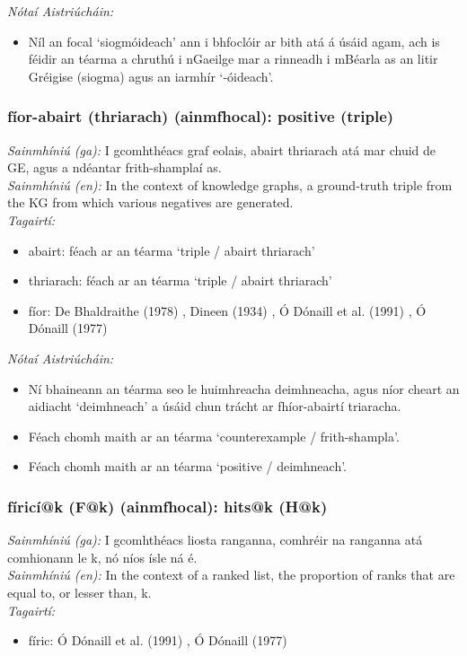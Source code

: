  \noindent \textit{Nótaí Aistriúcháin:}
\begin{itemize}
	\item Níl an focal `siogmóideach' ann i bhfoclóir ar bith atá á úsáid agam, ach is féidir an téarma a chruthú i nGaeilge mar a rinneadh i mBéarla as an litir Gréigise (siogma) agus an iarmhír `-óideach'.
\end{itemize}


\subsubsection*{fíor-abairt (thriarach) (ainmfhocal): positive (triple)}
 \noindent \textit{Sainmhíniú (ga):} I gcomhthéacs graf eolais, abairt thriarach atá mar chuid de GE, agus a ndéantar frith-shamplaí as.
\\
 \noindent \textit{Sainmhíniú (en):} In the context of knowledge graphs, a ground-truth triple from the KG from which various negatives are generated.
\\
 \noindent \textit{Tagairtí:}
\begin{itemize}
	\item abairt: féach ar an téarma `triple / abairt thriarach'
	\item thriarach: féach ar an téarma `triple / abairt thriarach'
	\item fíor: De Bhaldraithe (1978) \cite{de-bhaldraithe}, Dineen (1934) \cite{dineen}, Ó Dónaill et al. (1991) \cite{focloir-beag}, Ó Dónaill (1977) \cite{odonaill}
\end{itemize}

 \noindent \textit{Nótaí Aistriúcháin:}
\begin{itemize}
	\item Ní bhaineann an téarma seo le huimhreacha deimhneacha, agus níor cheart an aidiacht `deimhneach' a úsáid chun trácht ar fhíor-abairtí triaracha.
	\item Féach chomh maith ar an téarma `counterexample / frith-shampla'.
	\item Féach chomh maith ar an téarma `positive / deimhneach'.
\end{itemize}


\subsubsection*{fíricí@k (F@k) (ainmfhocal): hits@k (H@k)}
 \noindent \textit{Sainmhíniú (ga):} I gcomhthéacs liosta ranganna, comhréir na ranganna atá comhionann le k, nó níos ísle ná é.
\\
 \noindent \textit{Sainmhíniú (en):} In the context of a ranked list, the proportion of ranks that are equal to, or lesser than, k.
\\
 \noindent \textit{Tagairtí:}
\begin{itemize}
	\item fíric: Ó Dónaill et al. (1991) \cite{focloir-beag}, Ó Dónaill (1977) \cite{odonaill}
\end{itemize}


